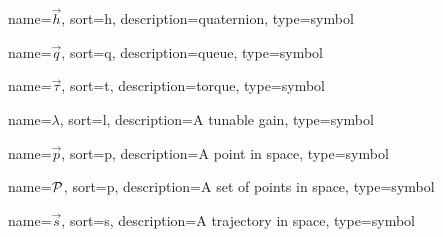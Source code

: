 	{%
		name=\ensuremath{\vec{h}},
		sort=h,
		description=quaternion,
		type=symbol
	}
	\newcommand{\quaternion}{\gls{sym:quaternion}}

	{%
		name=\ensuremath{\vec{q}},
		sort=q,
		description=queue,
		type=symbol
	}
	\newcommand{\queue}{\gls{sym:queue}}

	{%
		name=\ensuremath{\vec{\tau}},
		sort=t,
		description=torque,
		type=symbol
	}
	\newcommand{\torque}{\gls{sym:torque}}

	{%
		name={\ensuremath{\lambda}},
		sort=l,
		description=A tunable gain,
		type=symbol
	}
	\newcommand{\gain}{\gls{sym:gain}}

	{%
		name={\ensuremath{\vec{p}}},
		sort=p,
		description=A point in space,
		type=symbol
	}
	\newcommand{\point}{\gls{sym:point}}

	{%
		name={\ensuremath{\set{P}}},
		sort=p,
		description=A set of points in space,
		type=symbol
	}
	\newcommand{\setofpoints}{\gls{sym:setofpoints}}

	{%
		name={\ensuremath{\vec{s}}},
		sort=s,
		description=A trajectory in space,
		type=symbol
	}
	\newcommand{\traj}{\gls{sym:traj}}

